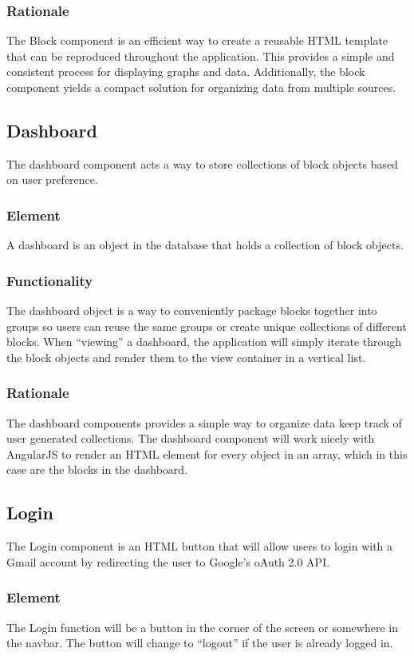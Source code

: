 \documentclass[journal,10pt,onecolumn,compsoc]{IEEEtran}
\begin{document}
			\subsubsection{Rationale} 
				The Block component is an efficient way to create a reusable HTML template that can be reproduced throughout the application. 
				This provides a simple and consistent process for displaying graphs and data. Additionally, the block component yields a compact solution for organizing data from multiple sources. 
		
		\subsection{Dashboard}
			The dashboard component acts a way to store collections of block objects based on user preference.
			\subsubsection{Element} 
				A dashboard is an object in the database that holds a collection of block objects.
			\subsubsection{Functionality}
				The dashboard object is a way to conveniently package blocks together into groups so users can reuse the same groups or create unique collections of different blocks. 
				When ``viewing'' a dashboard, the application will simply iterate through the block objects and render them to the view container in a vertical list.
			\subsubsection{Rationale} 
				The dashboard components provides a simple way to organize data keep track of user generated collections. 
				The dashboard component will work nicely with AngularJS to render an HTML element for every object in an array, which in this case are the blocks in the dashboard.
	
		\subsection{Login}
			The Login component is an HTML button that will allow users to login with a Gmail account by redirecting the user to Google's oAuth 2.0 API.
			\subsubsection{Element}
				The Login function will be a button in the corner of the screen or somewhere in the navbar. The button will change to ``logout'' if the user is already logged in.
\end{document}
